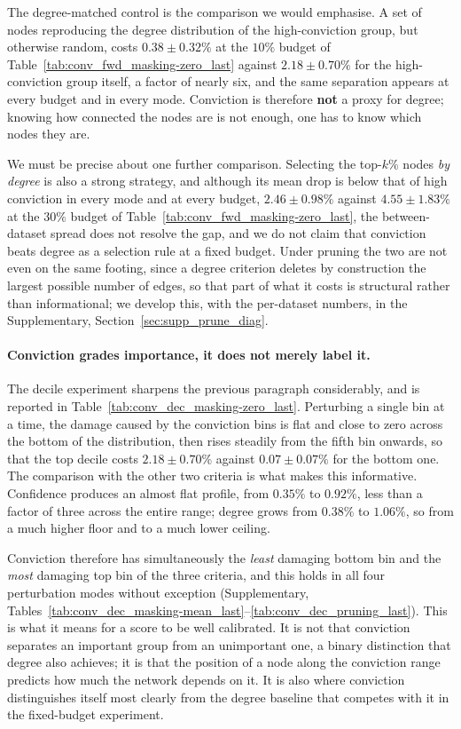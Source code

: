 The degree-matched control is the comparison we would emphasise. A set of nodes
reproducing the degree distribution of the high-conviction group, but otherwise
random, costs $0.38 \pm 0.32\%$ at the $10\%$ budget of
Table~\ref{tab:conv_fwd_masking-zero_last} against $2.18 \pm 0.70\%$ for the
high-conviction group itself, a factor of nearly six, and the same separation
appears at every budget and in every mode. Conviction is
therefore \textbf{not} a proxy for degree; knowing how connected the nodes are
is not enough, one has to know which nodes they are.

We must be precise about one further comparison. Selecting the top-$k\%$ nodes
\emph{by degree} is also a strong strategy, and although its mean drop is below
that of high conviction in every mode and at every budget, $2.46 \pm 0.98\%$
against $4.55 \pm 1.83\%$ at the $30\%$ budget of
Table~\ref{tab:conv_fwd_masking-zero_last}, the between-dataset spread does
not resolve the gap, and we do not claim that conviction beats degree as a
selection rule at a fixed budget. Under pruning the two are not even on the same
footing, since a degree criterion deletes by construction the largest possible
number of edges, so that part of what it costs is structural rather than
informational; we develop this, with the per-dataset numbers, in the
Supplementary, Section~\ref{sec:supp_prune_diag}.



\paragraph{Conviction grades importance, it does not merely label it.}
The decile experiment sharpens the previous paragraph considerably, and is
reported in Table~\ref{tab:conv_dec_masking-zero_last}. Perturbing a single bin
at a time, the damage caused by the conviction bins is flat and close to zero
across the bottom of the distribution, then rises steadily from the fifth bin
onwards, so that the top decile costs $2.18 \pm 0.70\%$ against
$0.07 \pm 0.07\%$ for the bottom one. The comparison with the other two criteria
is what makes this informative. Confidence produces an almost flat profile, from
$0.35\%$ to $0.92\%$, less than a factor of three across the entire range;
degree grows from $0.38\%$ to $1.06\%$, so from a much higher floor and to a
much lower ceiling.

Conviction therefore has simultaneously the \emph{least} damaging bottom bin and
the \emph{most} damaging top bin of the three criteria, and this holds in all
four perturbation modes without exception (Supplementary,
Tables~\ref{tab:conv_dec_masking-mean_last}--\ref{tab:conv_dec_pruning_last}).
This is what it means for a score to be well calibrated. It is not that
conviction separates an important group from an unimportant one, a binary
distinction that degree also achieves; it is that the position of a node along
the conviction range predicts how much the network depends on it. It is also
where conviction distinguishes itself most clearly from the degree baseline that
competes with it in the fixed-budget experiment.

